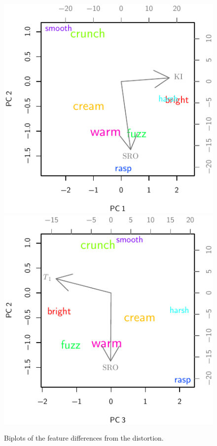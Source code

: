			\begin{figure}[h!]
				\centering
				\subfloat
				{
					\includegraphics{chapter4/Images/DistortionDifferenceCentroidsPCA1-2.pdf}
					\label{fig:DistortionDifferenceCentroidsPCA1-2}
				}
				\quad
				\subfloat
				{
					\includegraphics{chapter4/Images/DistortionDifferenceCentroidsPCA3-2.pdf}
					\label{fig:DistortionDifferenceCentroidsPCA3-2}
				}
				\caption{Biplots of the feature differences from the distortion.}
				\label{fig:DistortionDifferenceCentroidsPCAs}
			\end{figure}

